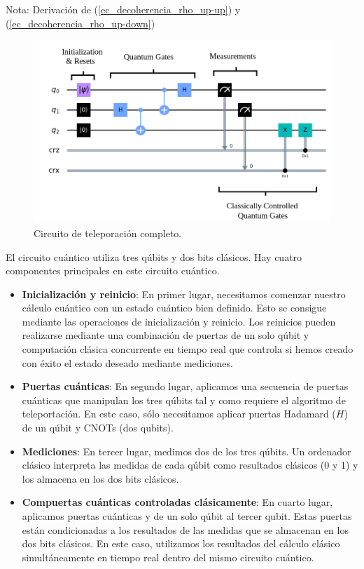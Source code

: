 \documentclass[a4paper,11pt]{book} %
\numberwithin{equation}{chapter}
\begin{document}
\begin{mybox_blue}{Nota: Derivación de (\ref{ec_decoherencia_rho_up-up}) y  (\ref{ec_decoherencia_rho_up-down})}
	\begin{figure}[H]
	\centering 
	\includegraphics[width=0.7\linewidth]{Figuras/Fig_elementos_teleportacion.png}
	\caption{Circuito de teleporación completo.}
	\label{Fig_elementos_teleportacion}
	\end{figure}

El circuito cuántico utiliza tres qúbits y dos bits clásicos. Hay cuatro componentes principales en este circuito cuántico.
\begin{itemize}
	\item \textbf{Inicialización y reinicio}: 
	En primer lugar, necesitamos comenzar nuestro cálculo cuántico con un estado cuántico bien definido. Esto se consigue mediante las operaciones de inicialización y reinicio. Los reinicios pueden realizarse mediante una combinación de puertas de un solo qúbit y computación clásica concurrente en tiempo real que controla si hemos creado con éxito el estado deseado mediante mediciones. 
 
 	\item \textbf{Puertas cuánticas}: 
 	En segundo lugar, aplicamos una secuencia de puertas cuánticas que manipulan los tres qúbits tal y como requiere el algoritmo de teleportación. En este caso, sólo necesitamos aplicar puertas Hadamard ($H$) de un qúbit y CNOTs (dos qubits).

 	
 	\item \textbf{Mediciones}:
 	En tercer lugar, medimos dos de los tres qúbits. Un ordenador clásico interpreta las medidas de cada qúbit como resultados clásicos (0 y 1) y los almacena en los dos bits clásicos.
 	
 	\item \textbf{Compuertas cuánticas controladas clásicamente}:
 	En cuarto lugar, aplicamos puertas cuánticas y de un solo qúbit al tercer qubit. Estas puertas están condicionadas a los resultados de las medidas que se almacenan en los dos bits clásicos. En este caso, utilizamos los resultados del cálculo clásico simultáneamente en tiempo real dentro del mismo circuito cuántico.
\end{itemize}




\end{mybox_blue}
\end{document}

